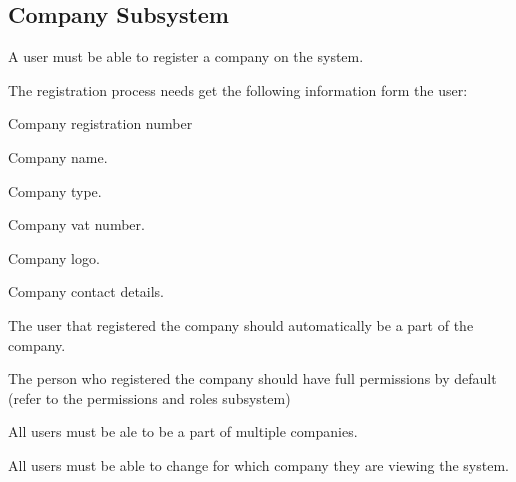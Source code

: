 \documentclass{article}
\begin{document}
	\subsection*{Company Subsystem}	
	\begin{list}{R.}{}
		\item A user must be able to register a company on the system.
		\item The registration process needs get the following information form the user: 
		\begin{list}{R.}{}
			\item Company registration number
			\item Company name.
			\item Company type.
			\item Company vat number.
			\item Company logo.
			\item Company contact details.
		\end{list} 
		\item The user that registered the company should automatically be a part of the company.
		\item The person who registered the company should have full permissions by default (refer to the permissions and roles subsystem)
		\item All users must be ale to be a part of multiple companies.
		\item All users must be able to change for which company they are viewing the system. 
	\end{list}
	
\end{document}
